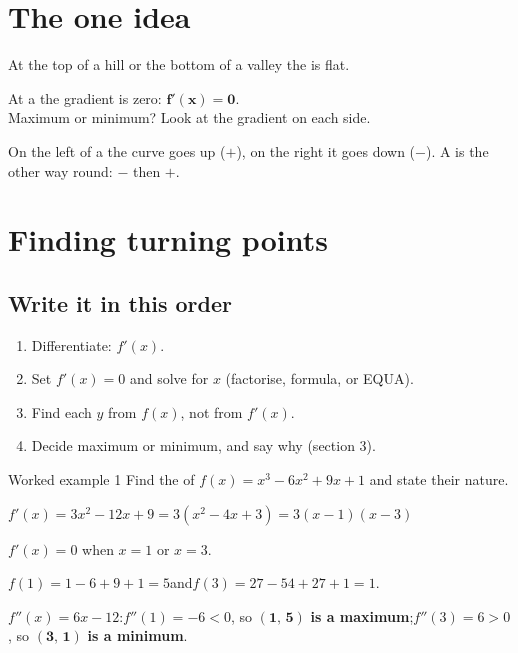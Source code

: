 \documentclass[11pt]{article}
\newlength\figunit
\begin{document}

\section{The one idea}\label{idea}
\begin{minipage}[c]{0.54\linewidth}
At the top of a hill or the bottom of a valley the \ttangent is flat.
\begin{keybox}
At a \tturn the gradient is zero: $\mathbf{f'(x)=0}$.\\
Maximum or minimum? Look at the gradient on each side.
\end{keybox}
On the left of a  the curve goes up ($+$), on the right it goes down ($-$).
A  is the other way round: $-$ then $+$.
\end{minipage}\hfill
\begin{minipage}[c]{0.42\linewidth}\centering
\setlength\figunit{11mm}

\end{minipage}

\section{Finding turning points}\label{find}
\subsection{Write it in this order}
\begin{enumerate}[leftmargin=7mm, itemsep=1pt]
\item Differentiate: $f'(x)$.
\item Set $f'(x)=0$ and solve for $x$ (factorise, formula, or \textsf{EQUA}).
\item Find each $y$ from $f(x)$, not from $f'(x)$.
\item Decide maximum or minimum, and say why (section 3).
\end{enumerate}

\begin{example}{Worked example 1}
Find the \tturns of $f(x)=x^{3}-6x^{2}+9x+1$ and state their nature.
\begin{steps}
\item $f'(x)=3x^{2}-12x+9=3(x^{2}-4x+3)=3(x-1)(x-3)$
\item $f'(x)=0$ when $x=1$ or $x=3$.
\item $f(1)=1-6+9+1=5$\quad and\quad $f(3)=27-54+27+1=1$.
\item $f''(x)=6x-12$:\quad $f''(1)=-6<0$, so $\mathbf{(1,\,5)}$ \textbf{is a maximum};\quad $f''(3)=6>0$, so $\mathbf{(3,\,1)}$ \textbf{is a minimum}.
\end{steps}
\end{example}
\end{document}
